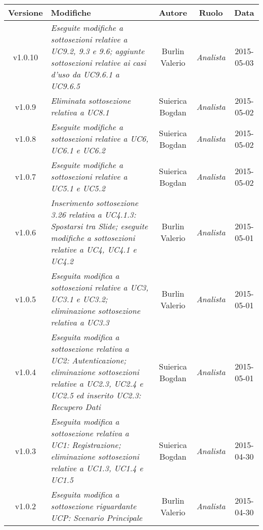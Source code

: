 \newpage
\begin{table}[h]
\centering
\begin{tabular}{|c|p{}|c|c|c|}
	\toprule
		\textbf{Versione} & \textbf{Modifiche} & \textbf{Autore} & \textbf{Ruolo} & \textbf{Data}\\
	\midrule
	\midrule
		v1.0.10 & \textit{Eseguite modifiche a sottosezioni relative a UC9.2, 9.3 e 9.6; aggiunte sottosezioni relative ai casi d'uso da UC9.6.1 a UC9.6.5} & Burlin Valerio & \textit{Analista} & 2015-05-03\\
	\midrule
		v1.0.9 & \textit{Eliminata sottosezione relativa a UC8.1} & Suierica Bogdan & \textit{Analista} & 2015-05-02\\
	\midrule
		v1.0.8 & \textit{Eseguite modifiche a sottosezioni relative a UC6, UC6.1 e UC6.2} & Suierica Bogdan & \textit{Analista} & 2015-05-02\\
	\midrule
		v1.0.7 & \textit{Eseguite modifiche a sottosezioni relative a UC5.1 e UC5.2} & Suierica Bogdan & \textit{Analista} & 2015-05-02\\
	\midrule
		v1.0.6 & \textit{Inserimento sottosezione 3.26 relativa a UC4.1.3: Spostarsi tra Slide; eseguite modifiche a sottosezioni relative a UC4, UC4.1 e UC4.2} & Burlin Valerio & \textit{Analista} & 2015-05-01\\
	\midrule
		v1.0.5 & \textit{Eseguita modifica a sottosezioni relative a UC3, UC3.1 e UC3.2; eliminazione sottosezione relativa a UC3.3} & Burlin Valerio & \textit{Analista} & 2015-05-01\\
	\midrule
		v1.0.4 & \textit{Eseguita modifica a sottosezione relativa a UC2: Autenticazione; eliminazione sottosezioni relative a UC2.3, UC2.4 e UC2.5 ed inserito UC2.3: Recupero Dati} & Suierica Bogdan & \textit{Analista} & 2015-05-01\\
	\midrule
		v1.0.3 & \textit{Eseguita modifica a sottosezione relativa a UC1: Registrazione; eliminazione sottosezioni relative a UC1.3, UC1.4 e UC1.5} & Suierica Bogdan & \textit{Analista} & 2015-04-30\\
	\midrule
		v1.0.2 & \textit{Eseguita modifica a sottosezione riguardante UCP: Scenario Principale} & Burlin Valerio & \textit{Analista} & 2015-04-30\\
	\bottomrule
\end{tabular}
\end{table}
\newpage
